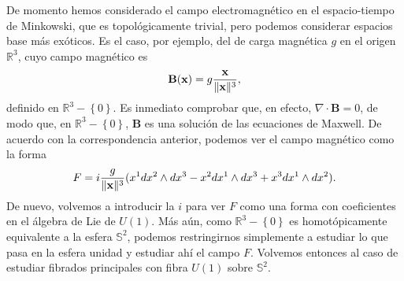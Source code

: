 \documentclass[12pt,a4paper]{article}
\theoremstyle{definition} \newtheorem{defn}[thm]{Definición}
\theoremstyle{definition} \newtheorem{ejemplo}[thm]{Ejemplo}
\theoremstyle{definition} \newtheorem{ejercicio}[thm]{Ejercicio}
\theoremstyle{remark} \newtheorem*{obs}{Observación}
\def\RR{\mathbb{R}}
\def\SF{\mathbb{S}}
\newcommand{\ve}[1]{\mathbf{#1}}
\DeclarePairedDelimiter\norm{\lVert}{\rVert}
\let\emph\relax
\begin{document}
	   De momento hemos considerado el campo electromagnético en el espacio-tiempo de Minkowski, que es topológicamente trivial, pero podemos considerar espacios base más exóticos. Es el caso, por ejemplo, del \emph{monopolo magnético} de carga magnética $g$ en el origen $\RR^3$, cuyo campo magnético es
	   \begin{equation*}
	     \ve{B}(\ve{x})=g\frac{\ve{x}}{\norm{\ve{x}}^3},
	   \end{equation*}
	   definido en $\RR^3-\left\{ 0 \right\}$. Es inmediato comprobar que, en efecto, $\nabla \cdot \ve{B} =0$, de modo que, en $\RR^3-\left\{ 0 \right\}$, $\ve{B}$ es una solución de las ecuaciones de Maxwell. De acuerdo con la correspondencia anterior, podemos ver el campo magnético como la forma 
	   \begin{equation*}
	     F=i\frac{g}{\norm{\ve{x}}^3}(x^1 dx^2\wedge dx^3-x^2 dx^1\wedge dx^3 + x^3 dx^1 \wedge dx^2).
	   \end{equation*}
	   De nuevo, volvemos a introducir la $i$ para ver $F$ como una forma con coeficientes en el álgebra de Lie de $U(1)$.
	   Más aún, como $\RR^3-\left\{ 0 \right\}$ es homotópicamente equivalente a la esfera $\SF^2$, podemos restringirnos simplemente a estudiar lo que pasa en la esfera unidad y estudiar ahí el campo $F$. Volvemos entonces al caso de estudiar fibrados principales con fibra $U(1)$ sobre $\SF^2$.
\end{document}
